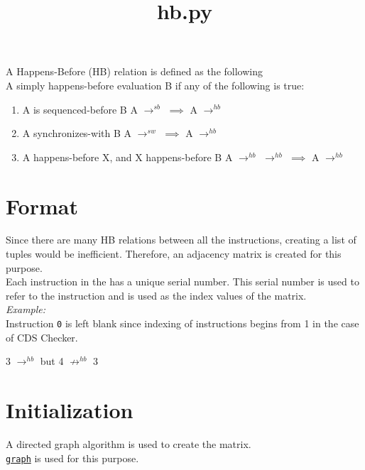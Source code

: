 \documentclass{article}
\date{}
\newcommand{\class}[1]{\color{DarkOrchid}\texttt{#1}\color{black}}
\newcommand{\seqb}[2]{{#1} {\color{Blue}$\rightarrow^{sb}$} \color{black}{#2} }
\newcommand{\sw}[2]{{#1} {\color{Blue}$\rightarrow^{sw}$} \color{black}{#2} }
\newcommand{\hb}[2]{{#1} {\color{OliveGreen}$\rightarrow^{hb}$} \color{black}{#2}}
\begin{document}
\title{hb.py}
\maketitle

A Happens-Before (HB) relation is defined as the following\\
A simply happens-before evaluation B if any of the following is true:
\begin{enumerate}
    \item A is sequenced-before B
    \newline
    \seqb{A}{B} $\implies$ \hb{A}{B}
    \item A synchronizes-with B
    \newline
    \sw{A}{B} $\implies$ \hb{A}{B}
    \item A happens-before X, and X happens-before B
    \newline
    \hb{\hb{A}{X}}{B} $\implies$ \hb{A}{B}
\end{enumerate} 

\section{Format}
Since there are many HB relations between all the instructions, creating a list of tuples would be inefficient. Therefore, an adjacency matrix is created for this purpose.\\

Each instruction in the has a unique serial number. This serial number is used to refer to the instruction and is used as the index values of the matrix.\\
\textit{Example:}\\

Instruction \texttt{0} is left blank since indexing of instructions begins from 1 in the case of CDS Checker.

\hb{3}{4} but 4 \color{OliveGreen}$\not\to^{hb}$\color{black} 3

\section{Initialization}
A directed graph algorithm is used to create the matrix.\\
\href{graph.tex}{\class{graph}} is used for this purpose.\\
\end{document}
